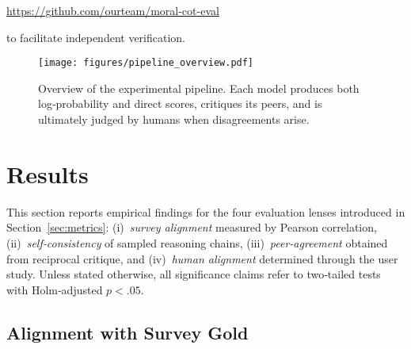 \documentclass[11pt]{article}
\begin{document}
\centerline{\url{https://github.com/ourteam/moral-cot-eval}}

to facilitate independent verification.

\begin{figure}[t]
  \centering
  \texttt{[image: figures/pipeline\_overview.pdf]}
  \caption{\small Overview of the experimental pipeline.  Each model produces both log‑probability and direct scores, critiques its peers, and is ultimately judged by humans when disagreements arise.}
  \label{fig:pipeline_overview}
\end{figure}
















































\section{Results}
\label{sec:results}

This section reports empirical findings for the four evaluation lenses introduced in
Section~\ref{sec:metrics}: (i)~\emph{survey alignment} measured by Pearson
correlation, (ii)~\emph{self‑consistency} of sampled reasoning chains,
(iii)~\emph{peer‑agreement} obtained from reciprocal critique, and
(iv)~\emph{human alignment} determined through the user study.  Unless stated
otherwise, all significance claims refer to two‑tailed tests with Holm‐adjusted
$p<.05$.

\subsection{Alignment with Survey Gold}
\label{sec:results:correlation}
\end{document}
